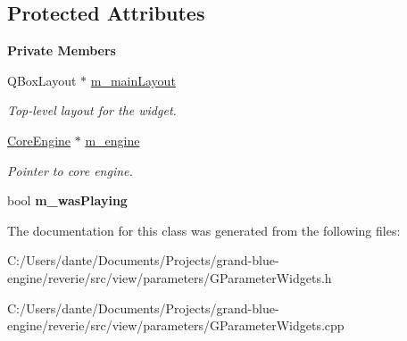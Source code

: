 \subsection*{Protected Attributes}
\begin{Indent}\textbf{ Private Members}\par
\begin{DoxyCompactItemize}
\item 
\mbox{\label{classrev_1_1_view_1_1_parameter_widget_aeafe7dcfa415802b70f59e1e9fecb59d}} 
Q\+Box\+Layout $\ast$ \mbox{\hyperlink{classrev_1_1_view_1_1_parameter_widget_aeafe7dcfa415802b70f59e1e9fecb59d}{m\+\_\+main\+Layout}}
\begin{DoxyCompactList}\small\item\em Top-\/level layout for the widget. \end{DoxyCompactList}\item 
\mbox{\label{classrev_1_1_view_1_1_parameter_widget_aa27d107c7f11e16960561626ac97f900}} 
\mbox{\hyperlink{classrev_1_1_core_engine}{Core\+Engine}} $\ast$ \mbox{\hyperlink{classrev_1_1_view_1_1_parameter_widget_aa27d107c7f11e16960561626ac97f900}{m\+\_\+engine}}
\begin{DoxyCompactList}\small\item\em Pointer to core engine. \end{DoxyCompactList}\item 
\mbox{\label{classrev_1_1_view_1_1_parameter_widget_a666773a8ec90dc2f38204facaa2ae71b}} 
bool {\bfseries m\+\_\+was\+Playing}
\end{DoxyCompactItemize}
\end{Indent}


The documentation for this class was generated from the following files\+:\begin{DoxyCompactItemize}
\item 
C\+:/\+Users/dante/\+Documents/\+Projects/grand-\/blue-\/engine/reverie/src/view/parameters/G\+Parameter\+Widgets.\+h\item 
C\+:/\+Users/dante/\+Documents/\+Projects/grand-\/blue-\/engine/reverie/src/view/parameters/G\+Parameter\+Widgets.\+cpp\end{DoxyCompactItemize}
